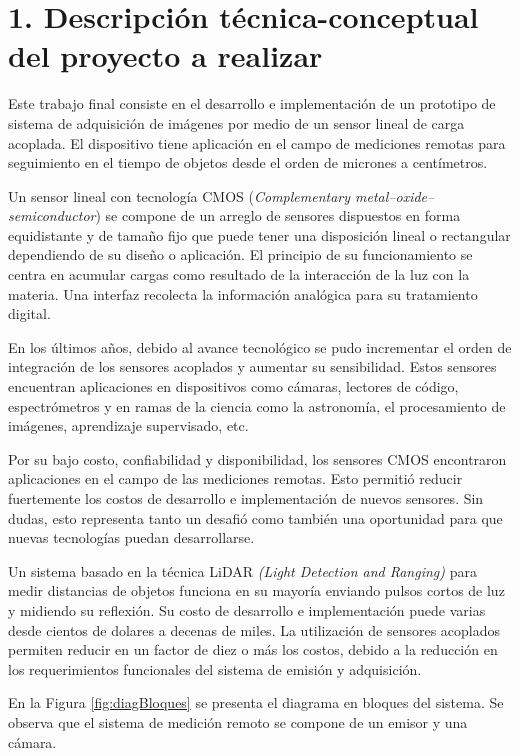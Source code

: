 \documentclass[
11pt, %
codirector, %
]{charter}
\begin{document}
\section{1. Descripción técnica-conceptual del proyecto a realizar}
\label{sec:descripcion}



Este trabajo final consiste en el desarrollo e implementación de un prototipo de sistema  de adquisición de imágenes por medio de un sensor lineal de carga acoplada. El dispositivo tiene aplicación en el campo de mediciones remotas para seguimiento en el tiempo de objetos desde el orden de  micrones a centímetros. 

Un sensor lineal con tecnología CMOS (\textit{Complementary metal–oxide–semiconductor}) se compone de un arreglo de sensores dispuestos en forma equidistante y de tamaño fijo que puede tener una disposición lineal o rectangular dependiendo de su diseño o aplicación. El principio de su funcionamiento se centra en acumular cargas como resultado de la interacción de la luz con la materia. Una interfaz recolecta la información analógica para su tratamiento digital.

En los últimos años, debido al avance tecnológico se pudo incrementar el orden de integración de los sensores acoplados y aumentar su sensibilidad. Estos sensores encuentran aplicaciones en dispositivos como cámaras, lectores de código, espectrómetros y en ramas de la ciencia como la astronomía, el procesamiento de imágenes, aprendizaje supervisado, etc.

Por su bajo costo, confiabilidad y disponibilidad, los sensores CMOS encontraron aplicaciones en el campo de las mediciones remotas. Esto permitió reducir fuertemente los costos de desarrollo e implementación de nuevos sensores. Sin dudas, esto representa tanto un desafió como también una oportunidad para que nuevas tecnologías puedan desarrollarse.

Un sistema  basado en la técnica  LiDAR \textit{(Light Detection and Ranging)} para medir distancias de objetos funciona en su mayoría enviando pulsos cortos de luz y midiendo su reflexión. Su costo de desarrollo e implementación puede varias desde cientos de dolares a decenas de miles. La utilización de sensores acoplados permiten reducir en un factor de diez o más los costos, debido a la reducción en los requerimientos funcionales del sistema de emisión y adquisición. 

En la Figura \ref{fig:diagBloques} se presenta el diagrama en bloques del sistema. Se observa que el sistema de medición remoto se compone de un emisor y una cámara. 
\end{document}
